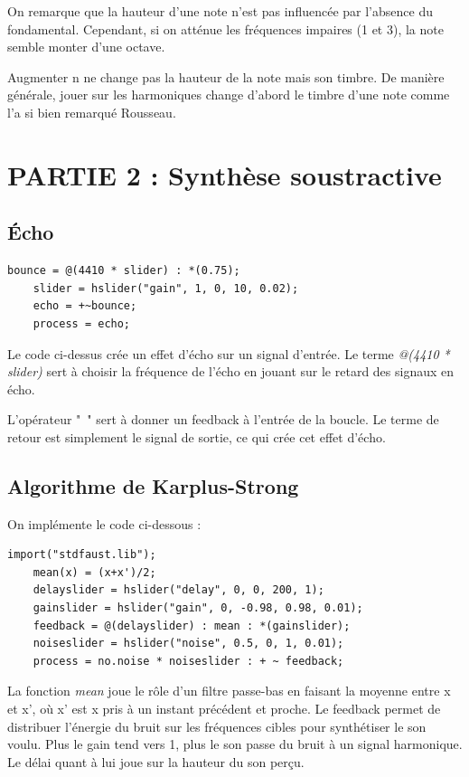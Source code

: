 \documentclass[12pt]{report}
\begin{document}
On remarque que la hauteur d'une note n'est pas influencée par l'absence du fondamental. %
Cependant, si on atténue les fréquences impaires (1 et 3), la note semble monter d'une octave. %

Augmenter n ne change pas la hauteur de la note mais son timbre. De manière %
générale, jouer sur les harmoniques change d'abord le timbre %
d'une note comme l'a si bien remarqué Rousseau.

\chapter{PARTIE 2 : Synthèse soustractive}

\section{Écho}
\begin{lstlisting}[language=Faust]
    bounce = @(4410 * slider) : *(0.75);
    slider = hslider("gain", 1, 0, 10, 0.02);
    echo = +~bounce;
    process = echo;
\end{lstlisting}

Le code ci-dessus crée un effet d'écho sur un signal d'entrée. Le terme \textit{@(4410 * slider)} sert %
à choisir la fréquence de l'écho en jouant sur le retard des signaux en écho.

L'opérateur "~" sert à donner un feedback à l'entrée de la boucle. Le terme de retour est simplement %
le signal de sortie, ce qui crée cet effet d'écho.

\section{Algorithme de Karplus-Strong}

On implémente le code ci-dessous : 

\begin{lstlisting}[language=Faust]
    import("stdfaust.lib");
    mean(x) = (x+x')/2;
    delayslider = hslider("delay", 0, 0, 200, 1);
    gainslider = hslider("gain", 0, -0.98, 0.98, 0.01);
    feedback = @(delayslider) : mean : *(gainslider);
    noiseslider = hslider("noise", 0.5, 0, 1, 0.01);
    process = no.noise * noiseslider : + ~ feedback;
\end{lstlisting}

La fonction \textit{mean} joue le rôle d'un filtre passe-bas en faisant la moyenne entre x et x', où x' est x pris %
à un instant précédent et proche. Le feedback permet de distribuer l'énergie du bruit sur les fréquences %
cibles pour synthétiser le son voulu.
Plus le gain tend vers 1, plus le son passe du bruit à un signal harmonique. 
Le délai quant à lui joue sur la hauteur du son perçu.
\end{document}
